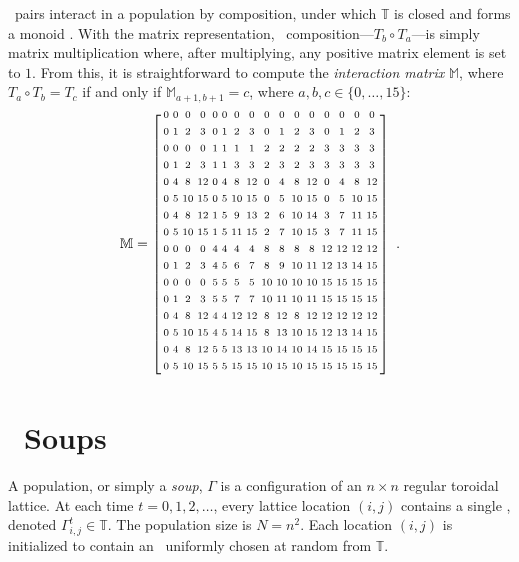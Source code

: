 \documentclass[pre,twocolumn,showpacs,superscriptaddress,preprintnumbers,floatfix]{revtex4}
\theoremstyle{plain}    \newtheorem{Lem}{Lemma}
\theoremstyle{plain}    \newtheorem*{ProLem}{Proof}
\theoremstyle{plain}    \newtheorem{Cor}{Corollary}
\theoremstyle{plain}    \newtheorem*{ProCor}{Proof}
\theoremstyle{plain}    \newtheorem{The}{Theorem}
\theoremstyle{plain}    \newtheorem*{ProThe}{Proof}
\theoremstyle{plain}    \newtheorem{Prop}{Proposition}
\theoremstyle{plain}    \newtheorem*{ProProp}{Proof}
\theoremstyle{plain}    \newtheorem*{Conj}{Conjecture}
\theoremstyle{plain}    \newtheorem*{Rem}{Remark}
\theoremstyle{plain}    \newtheorem{Def}{Definition}
\theoremstyle{plain}    \newtheorem*{Not}{Notation}
\newcommand{\T}{\mathbb{T}}
\newcommand{\M}{\mathbb{M}}
\begin{document}
\EM\ pairs interact in a population by composition, under which $\T$ is closed
and forms a monoid \cite{Holc82a}. With the matrix representation,
\eM\ composition---$T_b \circ T_a$---is simply matrix multiplication where,
after multiplying, any positive matrix element is set to $1$. From this, it is
straightforward to compute the \emph{interaction matrix} $\M$, where
$T_a \circ T_b = T_c$ if and only if $\M_{a+1, b+1} = c$,
where $a,b,c \in \{0, \ldots, 15\}$:
\begin{equation}
\M =
\left[
\begin{smallmatrix}
0&0&0&0&0&0&0&0&0&0&0&0&0&0&0&0\\
 \noalign{\medskip}
0&1&2&3&0&1&2&3&0&1&2&3&0&1&2&3\\
 \noalign{\medskip}
0&0&0&0&1&1&1&1&2&2&2&2&3&3&3&3\\
 \noalign{\medskip}
0&1&2&3&1&1&3&3&2&3&2&3&3&3&3&3\\
 \noalign{\medskip}
0&4&8&12&0&4&8&12&0&4&8&12&0&4&8&12\\
 \noalign{\medskip}
0&5&10&15&0&5&10&15&0&5&10&15&0&5&10&15\\
 \noalign{\medskip}
0&4&8&12&1&5&9&13&2&6&10&14&3&7&11&15\\
 \noalign{\medskip}
0&5&10&15&1&5&11&15&2&7&10&15&3&7&11&15\\
 \noalign{\medskip}
0&0&0&0&4&4&4&4&8&8&8&8&12&12&12&12\\
 \noalign{\medskip}
0&1&2&3&4&5&6&7&8&9&10&11&12&13&14&15\\
 \noalign{\medskip}
0&0&0&0&5&5&5&5&10&10&10&10&15&15&15&15\\
 \noalign{\medskip}
0&1&2&3&5&5&7&7&10&11&10&11&15&15&15&15\\
 \noalign{\medskip}
0&4&8&12&4&4&12&12&8&12&8&12&12&12&12&12\\
 \noalign{\medskip}
0&5&10&15&4&5&14&15&8&13&10&15&12&13&14&15\\
 \noalign{\medskip}
0&4&8&12&5&5&13&13&10&14&10&14&15&15&15&15\\
 \noalign{\medskip}
0&5&10&15&5&5&15&15&10&15&10&15&15&15&15&15\\
 \noalign{\medskip}
\end{smallmatrix}
    \right] ~.
\end{equation}

\section{\EM\ Soups}

A population, or simply a \emph{soup}, $\Gamma$ is a configuration of an
$n \times n$ regular toroidal lattice. At each time $t=0,1,2,\ldots$, every
lattice location $(i,j)$ contains a single \eM, denoted $\Gamma_{i,j}^t \in \T$.
The population size is $N = n^2$. Each location $(i,j)$ is initialized to
contain an \eM\ uniformly chosen at random from $\T$.
\end{document}
